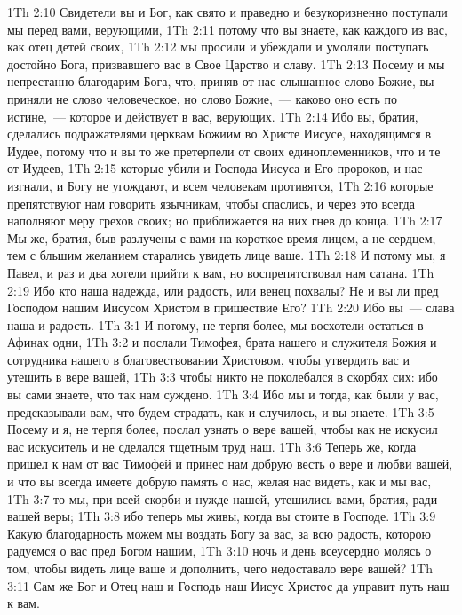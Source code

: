 \vs 1Th 2:10 Свидетели вы и Бог, как свято и праведно и безукоризненно поступали мы перед вами, верующими,
\vs 1Th 2:11 потому что вы знаете, как каждого из вас, как отец детей своих,
\vs 1Th 2:12 мы просили и убеждали и умоляли поступать достойно Бога, призвавшего вас в Свое Царство и славу.
\rsbpar\vs 1Th 2:13 Посему и мы непрестанно благодарим Бога, что, приняв от нас слышанное слово Божие, вы приняли не  слово человеческое, но  слово Божие,~--- каково оно есть по истине,~--- которое и действует в вас, верующих.
\vs 1Th 2:14 Ибо вы, братия, сделались подражателями церквам Божиим во Христе Иисусе, находящимся в Иудее, потому что и вы то же претерпели от своих единоплеменников, что и те от Иудеев,
\vs 1Th 2:15 которые убили и Господа Иисуса и Его пророков, и нас изгнали, и Богу не угождают, и всем человекам противятся,
\vs 1Th 2:16 которые препятствуют нам говорить язычникам, чтобы спаслись, и через это всегда наполняют меру грехов своих; но приближается на них гнев до конца.
\rsbpar\vs 1Th 2:17 Мы же, братия, быв разлучены с вами на короткое время лицем, а не сердцем, тем с бльшим желанием старались увидеть лице ваше.
\vs 1Th 2:18 И потому мы, я Павел, и раз и два хотели прийти к вам, но воспрепятствовал нам сатана.
\vs 1Th 2:19 Ибо кто наша надежда, или радость, или венец похвалы? Не и вы ли пред Господом нашим Иисусом Христом в пришествие Его?
\vs 1Th 2:20 Ибо вы~--- слава наша и радость.
\vs 1Th 3:1 И потому, не терпя более, мы восхотели остаться в Афинах одни,
\vs 1Th 3:2 и послали Тимофея, брата нашего и служителя Божия и сотрудника нашего в благовествовании Христовом, чтобы утвердить вас и утешить в вере вашей,
\vs 1Th 3:3 чтобы никто не поколебался в скорбях сих: ибо вы сами знаете, что так нам суждено.
\vs 1Th 3:4 Ибо мы и тогда, как были у вас, предсказывали вам, что будем страдать, как и случилось, и вы знаете.
\vs 1Th 3:5 Посему и я, не терпя более, послал узнать о вере вашей, чтобы как не искусил вас искуситель и не сделался тщетным труд наш.
\vs 1Th 3:6 Теперь же, когда пришел к нам от вас Тимофей и принес нам добрую весть о вере и любви вашей, и что вы всегда имеете добрую память о нас, желая нас видеть, как и мы вас,
\vs 1Th 3:7 то мы, при всей скорби и нужде нашей, утешились вами, братия, ради вашей веры;
\vs 1Th 3:8 ибо теперь мы живы, когда вы стоите в Господе.
\vs 1Th 3:9 Какую благодарность можем мы воздать Богу за вас, за всю радость, которою радуемся о вас пред Богом нашим,
\vs 1Th 3:10 ночь и день всеусердно молясь о том, чтобы видеть лице ваше и дополнить, чего недоставало вере вашей?
\vs 1Th 3:11 Сам же Бог и Отец наш и Господь наш Иисус Христос да управит путь наш к вам.
